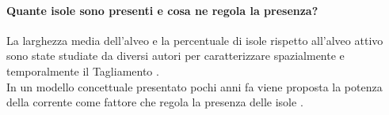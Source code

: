 \paragraph{Quante isole sono presenti e cosa ne regola la presenza?}
La larghezza media dell'alveo e la percentuale di isole rispetto all'alveo attivo sono state studiate da diversi autori per caratterizzare spazialmente e temporalmente il Tagliamento .
%
\\
In un modello concettuale presentato pochi anni fa viene proposta la potenza della corrente come fattore che regola la presenza delle isole .%

